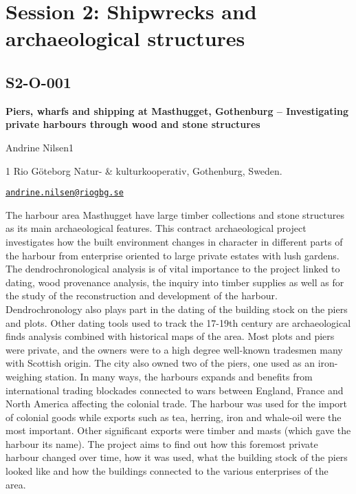 \documentclass[
]{book}
\begin{document}
\hypertarget{session-2-shipwrecks-and-archaeological-structures}{%
\chapter*{Session 2: Shipwrecks and archaeological structures}\label{session-2-shipwrecks-and-archaeological-structures}}

\hypertarget{s2-o-001}{%
\section*{S2-O-001}\label{s2-o-001}}

\textbf{Piers, wharfs and shipping at Masthugget, Gothenburg -- Investigating private harbours through wood and stone structures}

Andrine Nilsen1

1 Rio Göteborg Natur- \& kulturkooperativ, Gothenburg, Sweden.

\href{mailto:andrine.nilsen@riogbg.se}{\nolinkurl{andrine.nilsen@riogbg.se}}

The harbour area Masthugget have large timber collections and stone structures as its main archaeological features. This contract archaeological project investigates how the built environment changes in character in different parts of the harbour from enterprise oriented to large private estates with lush gardens. The dendrochronological analysis is of vital importance to the project linked to dating, wood provenance analysis, the inquiry into timber supplies as well as for the study of the reconstruction and development of the harbour. Dendrochronology also plays part in the dating of the building stock on the piers and plots. Other dating tools used to track the 17-19th century are archaeological finds analysis combined with historical maps of the area. Most plots and piers were private, and the owners were to a high degree well-known tradesmen many with Scottish origin. The city also owned two of the piers, one used as an iron-weighing station. In many ways, the harbours expands and benefits from international trading blockades connected to wars between England, France and North America affecting the colonial trade. The harbour was used for the import of colonial goods while exports such as tea, herring, iron and whale-oil were the most important. Other significant exports were timber and masts (which gave the harbour its name). The project aims to find out how this foremost private harbour changed over time, how it was used, what the building stock of the piers looked like and how the buildings connected to the various enterprises of the area.
\end{document}
